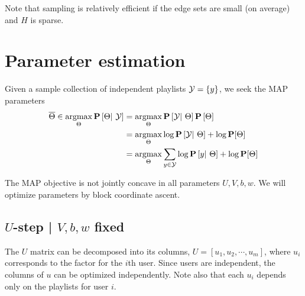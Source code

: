 \documentclass{article}
\begin{document}
Note that sampling is relatively efficient if the edge sets are small (on average) and $H$ is sparse.

\section{Parameter estimation}
Given a sample collection of independent playlists $\mathcal{Y} = \{y\}$, we seek the MAP 
parameters 
\begin{align*}
\overline{\Theta} \in \operatorname*{argmax}_\Theta \mathbf{P}\left[\Theta|~ \mathcal{Y}\right] &= \operatorname*{argmax}_\Theta \mathbf{P}\left[\mathcal{Y}|~\Theta\right]\mathbf{P}\left[\Theta\right]\\
&= \operatorname*{argmax}_\Theta \log \mathbf{P}\left[\mathcal{Y}|~\Theta\right] + \log\mathbf{P}[\Theta]\\
&= \operatorname*{argmax}_\Theta \sum_{y\in\mathcal{Y}} \log \mathbf{P}\left[y|~\Theta\right] + \log\mathbf{P}[\Theta]
\end{align*}

The MAP objective is not jointly concave in all parameters $U, V, b, w$.  We will optimize parameters by block coordinate ascent.

\subsection{$U$-step | $V, b, w$ fixed}
The $U$ matrix can be decomposed into its columns, $U = [u_1, u_2, \cdots, u_m]$, where $u_i$ corresponds to the factor for the $i$th user.
Since users are independent, the columns of $u$ can be optimized independently.  Note also that each $u_i$ depends only on the playlists for user $i$.
\end{document}
